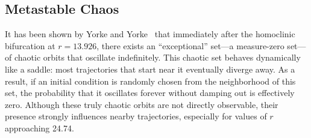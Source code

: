 \documentclass[paper=a4, fontsize=11pt]{scrartcl}
\numberwithin{equation}{section}		%
\numberwithin{figure}{section}			%
\numberwithin{table}{section}				%
\begin{document}
\subsection{Metastable Chaos}
It has been shown by Yorke and Yorke~\cite{Yorke1979} that immediately after the homoclinic bifurcation at \( r = 13.926 \), there exists an ``exceptional'' set---a measure-zero set---of chaotic orbits that oscillate indefinitely. This chaotic set behaves dynamically like a saddle: most trajectories that start near it eventually diverge away. As a result, if an initial condition is randomly chosen from the neighborhood of this set, the probability that it oscillates forever without damping out is effectively zero. Although these truly chaotic orbits are not directly observable, their presence strongly influences nearby trajectories, especially for values of \( r \) approaching 24.74.\\
\end{document}
